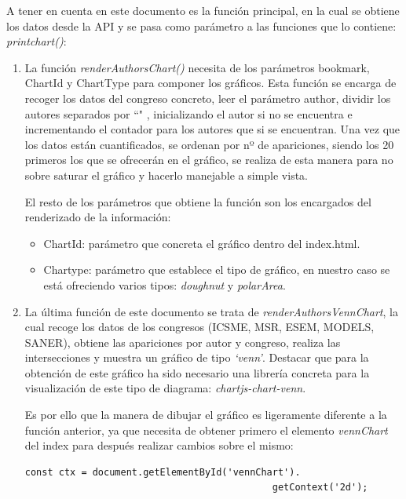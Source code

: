 \documentclass[a4paper, 12pt]{book}
\begin{document}
A tener en cuenta en este documento es la función principal, en la cual se obtiene los datos desde la API y se pasa como parámetro a las funciones que lo contiene: \textit{printchart()}:

\begin{enumerate}
    \item La función \textit{renderAuthorsChart()} necesita de los parámetros bookmark, ChartId y ChartType para componer los gráficos. Esta función se encarga de recoger los datos del congreso concreto, leer el parámetro author, dividir los autores separados por ``\textbar" , inicializando el autor si no se encuentra e incrementando el contador para los autores que si se encuentran.
    Una vez que los datos están cuantificados, se ordenan por nº de apariciones, siendo los 20 primeros los que se ofrecerán en el gráfico, se realiza de esta manera para no sobre saturar el gráfico y hacerlo manejable a simple vista.

El resto de los parámetros que obtiene la función son los encargados del renderizado de la información:

\begin{itemize}
    \item ChartId: parámetro que concreta el gráfico dentro del index.html.
    \item Chartype: parámetro que establece el tipo de gráfico, en nuestro caso se está ofreciendo varios tipos: \textit{doughnut} y \textit{polarArea}.
\end{itemize}
\item La última función de este documento se trata de \textit{renderAuthorsVennChart}, la cual recoge los datos de los congresos (ICSME, MSR, ESEM, MODELS, SANER), obtiene las apariciones por autor y congreso, realiza las intersecciones y muestra un gráfico de tipo \textit{`venn'}. Destacar que para la obtención de este gráfico ha sido necesario una librería concreta para la visualización de este tipo de diagrama: \textit{chartjs-chart-venn}. 

Es por ello que la manera de dibujar el gráfico es ligeramente diferente a la función anterior, ya que necesita de obtener primero el elemento \textit{vennChart} del index para después realizar cambios sobre el mismo:

\begin{verbatim}
const ctx = document.getElementById('vennChart').
                                            getContext('2d');
\end{verbatim}
\end{enumerate}
\end{document}

